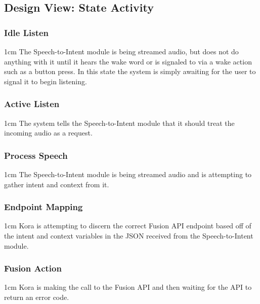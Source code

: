 \documentclass[onecolumn, draftclsnofoot,10pt, compsoc]{IEEEtran}
\def \botname{Kora\xspace}
\newenvironment{indentItem}[1][1cm]{\begin{adjustwidth}{#1}{}}{\end{adjustwidth}}
\begin{document}
	\subsection{Design View: State Activity}
		\subsubsection{Idle Listen}
			\begin{indentItem}
				The Speech-to-Intent module is being streamed audio, but does not do anything with it until it hears the wake word or is signaled to via a wake action such as a button press.
				In this state the system is simply awaiting for the user to signal it to begin listening.
			\end{indentItem}
	
	\subsubsection{Active Listen}
		\begin{indentItem}
			The system tells the Speech-to-Intent module that it should treat the incoming audio as a request.
		\end{indentItem}
	
	\subsubsection{Process Speech}
		\begin{indentItem}
			The Speech-to-Intent module is being streamed audio and is attempting to gather intent and context from it.
		\end{indentItem}
	
	\subsubsection{Endpoint Mapping}
		\begin{indentItem}
			\botname is attempting to discern the correct Fusion API endpoint based off of the intent and context variables in the JSON received from the Speech-to-Intent module.
		\end{indentItem}
		
	\subsubsection{Fusion Action}
		\begin{indentItem}
			\botname is making the call to the Fusion API and then waiting for the API to return an error code.
		\end{indentItem}
	
\end{document}
